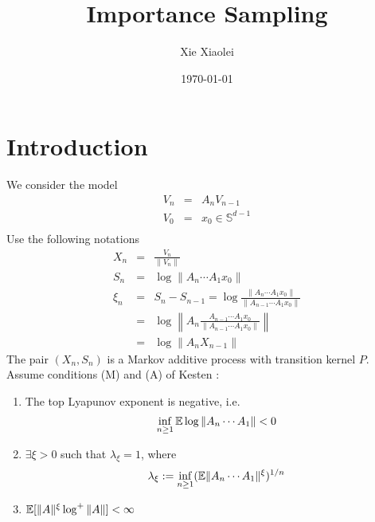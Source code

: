 \documentclass{article}
\title{Importance Sampling}
\author{Xie Xiaolei}
\date{\today}
\begin{document}
\maketitle
\section{Introduction}
We consider the model
\begin{eqnarray*}
V_n &=& A_n V_{n-1} \\
V_0 &=& x_0 \in \mathbb S^{d-1}\\
\end{eqnarray*}
Use the following notations
\begin{eqnarray*}
X_n &=& \frac{V_n}{\|V_n\|} \\
S_n &=& \log \|A_n \cdots A_1 x_0\| \\
\xi_n &=& S_n - S_{n-1} = \log\frac{\|A_n \cdots A_1 x_0\|}{\|A_{n-1}
  \cdots A_1 x_0\|} \\
&=& \log\left\| A_n \frac{A_{n-1} \cdots A_1 x_0}{\|A_{n-1} \cdots A_1
    x_0\|} \right\|\\
&=& \log \|A_n X_{n-1}\|
\end{eqnarray*}
The pair $(X_n, S_n)$ is a Markov additive process with transition
kernel $P$. Assume conditions (M) and (A) of Kesten \cite{Kesten1973}:
\begin{enumerate}
\item The top Lyapunov exponent is negative, i.e.
  \begin{equation}
    \label{eq:neg_top_Lyapunov}
    \inf_{n \geq 1} \mathbb{E} \log \|A_n \cdots A_1\| < 0    
  \end{equation}
\item $\exists \xi > 0$ such that $\lambda_{\xi} = 1$, where
  $$
  \lambda_{\xi} := \inf_{n \geq 1} (\mathbb{E} \|A_n \cdots A_1\|^\xi)^{1/n}
  $$
\item $\mathbb{E}[\|A\|^\xi \log^+\|A\|] < \infty$
\end{enumerate}
\end{document}
